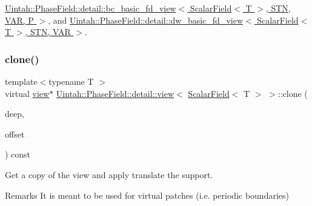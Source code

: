 \hyperlink{classUintah_1_1PhaseField_1_1detail_1_1bc__basic__fd__view_3_01ScalarField_3_01T_01_4_00_01STN_00_01VAR_00_01P_01_4_aefe3932d2c0c72fe420417f7291b4c15}{Uintah\+::\+Phase\+Field\+::detail\+::bc\+\_\+basic\+\_\+fd\+\_\+view$<$ Scalar\+Field$<$ T $>$, S\+T\+N, V\+A\+R, P $>$}, and \hyperlink{classUintah_1_1PhaseField_1_1detail_1_1dw__basic__fd__view_3_01ScalarField_3_01T_01_4_00_01STN_00_01VAR_01_4_a4eb9e3d89bde232c59088512c30b2ce7}{Uintah\+::\+Phase\+Field\+::detail\+::dw\+\_\+basic\+\_\+fd\+\_\+view$<$ Scalar\+Field$<$ T $>$, S\+T\+N, V\+A\+R $>$}.

\mbox{\label{classUintah_1_1PhaseField_1_1detail_1_1view_3_01ScalarField_3_01T_01_4_01_4_abd928104240e329f3bc4441ebab7c50c}} 
\subsubsection{\texorpdfstring{clone()}{clone()}\hspace{0.1cm}{\footnotesize\ttfamily [2/2]}}
{\footnotesize\ttfamily template$<$typename T $>$ \\
virtual \hyperlink{classUintah_1_1PhaseField_1_1detail_1_1view}{view}$\ast$ \hyperlink{classUintah_1_1PhaseField_1_1detail_1_1view}{Uintah\+::\+Phase\+Field\+::detail\+::view}$<$ \hyperlink{structUintah_1_1PhaseField_1_1ScalarField}{Scalar\+Field}$<$ T $>$ $>$\+::clone (\begin{DoxyParamCaption}\item[{bool}]{deep,  }\item[{const Int\+Vector \&}]{offset }\end{DoxyParamCaption}) const\hspace{0.3cm}{\ttfamily [pure virtual]}}



Get a copy of the view and apply translate the support. 

\begin{DoxyRemark}{Remarks}
It is meant to be used for virtual patches (i.\+e. periodic boundaries)
\end{DoxyRemark}

